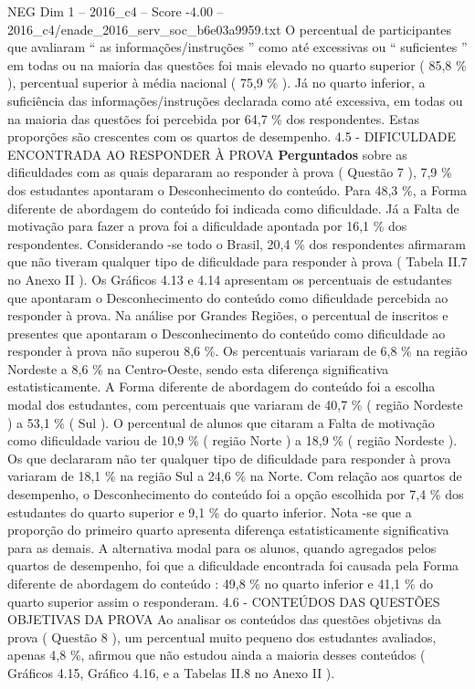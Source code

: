 \begin{textsample}{NEG Dim 1 – 2016\_c4 – Score -4.00 – 2016\_c4/enade\_2016\_serv\_soc\_b6e03a9959.txt}
O percentual de participantes que avaliaram “ as informações/instruções ” como até excessivas ou “ suficientes ” em todas ou na maioria das questões foi mais elevado no quarto superior ( 85,8 \% ), percentual superior à média nacional ( 75,9 \% ).
Já no quarto inferior, a suficiência das informações/instruções declarada como até excessiva, em todas ou na maioria das questões foi percebida por 64,7 \% dos respondentes.
Estas proporções são crescentes com os quartos de desempenho. 4.5 - DIFICULDADE ENCONTRADA AO RESPONDER À PROVA \textbf{Perguntados} sobre as dificuldades com as quais depararam ao responder à prova ( Questão 7 ), 7,9 \% dos estudantes apontaram o Desconhecimento do conteúdo.
Para 48,3 \%, a Forma diferente de abordagem do conteúdo foi indicada como dificuldade.
Já a Falta de motivação para fazer a prova foi a dificuldade apontada por 16,1 \% dos respondentes.
Considerando -se todo o Brasil, 20,4 \% dos respondentes afirmaram que não tiveram qualquer tipo de dificuldade para responder à prova ( Tabela II.7 no Anexo II ).
Os Gráficos 4.13 e 4.14 apresentam os percentuais de estudantes que apontaram o Desconhecimento do conteúdo como dificuldade percebida ao responder à prova.
Na análise por Grandes Regiões, o percentual de inscritos e presentes que apontaram o Desconhecimento do conteúdo como dificuldade ao responder à prova não superou 8,6 \%.
Os percentuais variaram de 6,8 \% na região Nordeste a 8,6 \% na Centro-Oeste, sendo esta diferença significativa estatisticamente.
A Forma diferente de abordagem do conteúdo foi a escolha modal dos estudantes, com percentuais que variaram de 40,7 \% ( região Nordeste ) a 53,1 \% ( Sul ).
O percentual de alunos que citaram a Falta de motivação como dificuldade variou de 10,9 \% ( região Norte ) a 18,9 \% ( região Nordeste ).
Os que declararam não ter qualquer tipo de dificuldade para responder à prova variaram de 18,1 \% na região Sul a 24,6 \% na Norte.
Com relação aos quartos de desempenho, o Desconhecimento do conteúdo foi a opção escolhida por 7,4 \% dos estudantes do quarto superior e 9,1 \% do quarto inferior.
Nota -se que a proporção do primeiro quarto apresenta diferença estatisticamente significativa para as demais.
A alternativa modal para os alunos, quando agregados pelos quartos de desempenho, foi que a dificuldade encontrada foi causada pela Forma diferente de abordagem do conteúdo : 49,8 \% no quarto inferior e 41,1 \% do quarto superior assim o responderam. 4.6 - CONTEÚDOS DAS QUESTÕES OBJETIVAS DA PROVA Ao analisar os conteúdos das questões objetivas da prova ( Questão 8 ), um percentual muito pequeno dos estudantes avaliados, apenas 4,8 \%, afirmou que não estudou ainda a maioria desses conteúdos ( Gráficos 4.15, Gráfico 4.16, e a Tabelas II.8 no Anexo II ).

\end{textsample}
